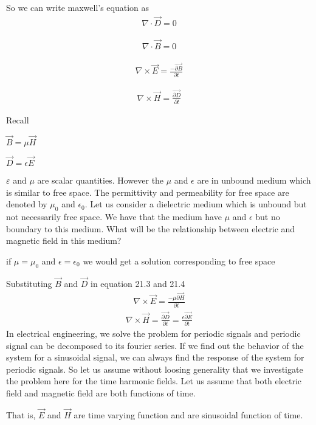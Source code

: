 So we can write maxwell's equation as
\begin{align}
\nabla\cdot\vec{D}=0
\end{align}

\begin{align}
\nabla\cdot\vec{B}=0
\end{align}

\begin{align}
\nabla\times\vec{E}=\frac{-\vec{\partial B}}{\partial t}
\end{align}

\begin{align}
\nabla\times\vec{H}=\frac{\vec{\partial D}}{\partial t}
\end{align}

Recall 

$\vec{B}=\mu\vec{H}$

$\vec{D}=\epsilon\vec{E}$

$\varepsilon$ and $\mu$ are scalar quantities. However the $\mu$ and $\epsilon$ are in unbound medium which is similar to free space. The permittivity and permeability for free space are denoted by $\mu_{0}$ and $\epsilon_{0}$. Let us consider a dielectric medium which is unbound but not necessarily free space. We have that the medium have  $\mu$ and $\epsilon$ but no boundary to this medium. What will be the relationship between electric and magnetic field in this medium? 


if $\mu=\mu_{0}$ and $\epsilon=\epsilon_{0}$ we would get a solution corresponding to free space

Substituting $\vec{B}$ and 	$\vec{D}$ in equation 21.3 and 21.4
\begin{align}
\nabla\times\vec{E}=\frac{-\mu\vec{\partial H}}{\partial t}
\end{align}
\begin{align}
\nabla\times\vec{H}=\frac{\vec{\partial D}}{\partial t}=\frac{\epsilon\vec{\partial E}}{\partial t}
\end{align}
In electrical engineering, we solve the problem for periodic signals and periodic signal can be decomposed to its fourier series. If we find out the behavior of the system for a sinusoidal signal, we can always find the response of the system for periodic signals. So let us assume without loosing generality that we investigate the problem here for the time harmonic fields. Let us assume that both electric field and magnetic field are both functions of time.

That is, $\vec{E}$ and $\vec{H}$ are time varying function and are sinusoidal function of time.

